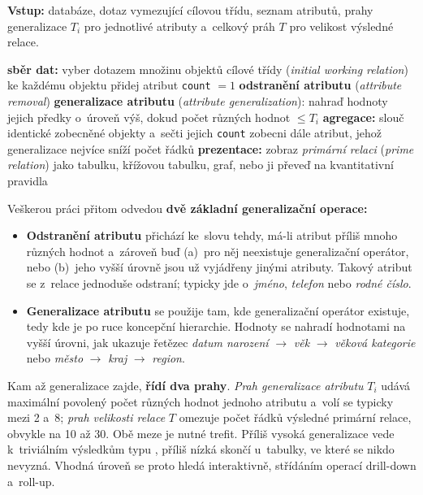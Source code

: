 \documentclass[11pt,a4paper]{article}
\theoremstyle{definition}
\begin{document}
\begin{defbox}
\textbf{Vstup:} databáze, dotaz vymezující cílovou třídu, seznam atributů, prahy generalizace
$T_i$ pro jednotlivé atributy a~celkový práh $T$ pro velikost výsledné relace.

\begin{algorithmic}[1]
\State \textbf{sběr dat:} vyber dotazem množinu objektů cílové třídy (\emph{initial working
       relation})
\State ke každému objektu přidej atribut \texttt{count} $=1$
      \State \textbf{odstranění atributu} (\emph{attribute removal})
      \State \textbf{generalizace atributu} (\emph{attribute generalization}): nahraď hodnoty
      \State jejich předky o~úroveň výš, dokud počet různých hodnot $\le T_i$
   \EndIf
\EndFor
\State \textbf{agregace:} slouč identické zobecněné objekty a~sečti jejich \texttt{count}
   \State zobecni dále atribut, jehož generalizace nejvíce sníží počet řádků
\EndWhile
\State \textbf{prezentace:} zobraz \emph{primární relaci} (\emph{prime relation}) jako
       tabulku, křížovou
\State tabulku, graf, nebo ji převeď na kvantitativní pravidla
\end{algorithmic}
\end{defbox}

Veškerou práci přitom odvedou \textbf{dvě základní generalizační operace:}
\begin{itemize}
\item \textbf{Odstranění atributu} přichází ke~slovu tehdy, má-li atribut příliš mnoho
      různých hodnot a~zároveň buď (a)~pro něj neexistuje generalizační operátor, nebo
      (b)~jeho vyšší úrovně jsou už vyjádřeny jinými atributy. Takový atribut se z~relace
      jednoduše odstraní; typicky jde o~\emph{jméno}, \emph{telefon} nebo \emph{rodné číslo}.
\item \textbf{Generalizace atributu} se použije tam, kde generalizační operátor existuje,
      tedy kde je po ruce koncepční hierarchie. Hodnoty se nahradí hodnotami na vyšší úrovni,
      jak ukazuje řetězec \emph{datum narození} $\to$ \emph{věk} $\to$ \emph{věková
      kategorie} nebo \emph{město} $\to$ \emph{kraj} $\to$ \emph{region}.
\end{itemize}

Kam až generalizace zajde, \textbf{řídí dva prahy}. \emph{Prah generalizace atributu} $T_i$
udává maximální povolený počet různých hodnot jednoho atributu a~volí se typicky mezi 2 a~8;
\emph{prah velikosti relace} $T$ omezuje počet řádků výsledné primární relace, obvykle na 10
až 30. Obě meze je nutné trefit. Příliš vysoká generalizace vede k~triviálním výsledkům typu
, příliš nízká skončí u~tabulky, ve které se nikdo nevyzná.
Vhodná úroveň se proto hledá interaktivně, střídáním operací drill-down a~roll-up.
\end{document}
